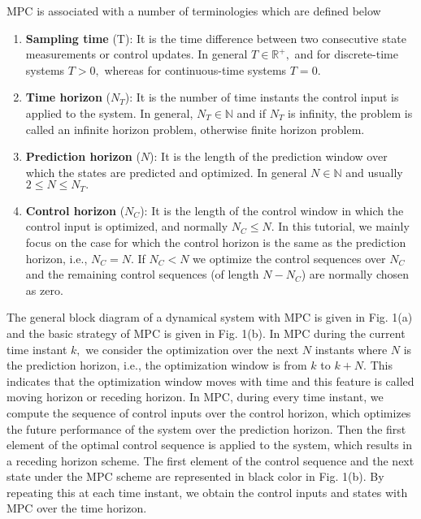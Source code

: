 \documentclass{article}
\begin{document}
\par MPC is associated with a number of terminologies which are defined below
\begin{enumerate}
        \item \textbf{Sampling time} (T): It is the time difference between two consecutive state measurements or control updates. In general $T\in \mathbb{R}^{+},$ and for discrete-time systems $T>0,$ whereas for continuous-time systems $T=0.$

    \item \textbf{Time horizon} ($N_{T}$): It is the number of time instants the control input is applied to the system. In general, $N_T \in \mathbb{N}$ and if $N_T$ is infinity, the problem is called an infinite horizon problem, otherwise finite horizon problem.
    \item \textbf{Prediction horizon} ($N$): It is the length of the prediction window over which the states are predicted and optimized. In general $N\in \mathbb{N}$ and usually $2\leq N\leq N_{T}.$
    \item \textbf{Control horizon} ($N_C$): It is the length of the control window in which the control input is optimized, and normally $N_C \leq N$. In this tutorial, we mainly focus on the case for which the control horizon is the same as the prediction horizon, i.e., $N_C=N.$
    If $N_C<N$ we optimize the control sequences over $N_C$ and the remaining control sequences (of length $N-N_C$) are normally chosen as zero. 
\end{enumerate}
The general block diagram of a dynamical system with MPC is given in Fig. 1(a) and
the basic strategy of MPC is given in Fig. 1(b). In MPC during the
current time instant $k,$ we consider the optimization over the next ${N}$ instants where
${N}$ is the prediction horizon, i.e., the optimization window is from $k$ to $k+{N}.$ This indicates that the optimization window moves with time and this feature is called moving horizon or receding horizon. 
In MPC, during every time instant, we compute the sequence of control inputs over the control horizon, which optimizes the future performance of the system over the prediction horizon. Then the first element of the optimal control sequence is applied to the system, which results in a receding horizon scheme. The first element of the control sequence and the next state under the MPC scheme are represented in black color in Fig. 1(b). By repeating this at each time instant, we obtain the control inputs and states with MPC over the time horizon. 
\end{document}

